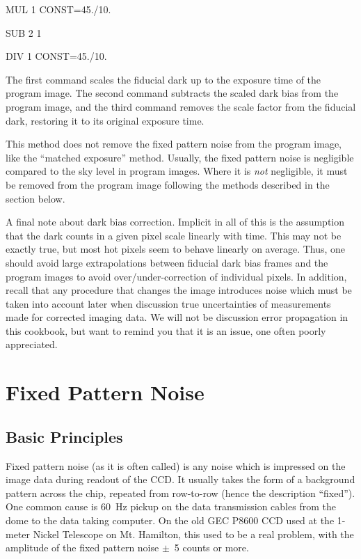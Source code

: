 \begin{command}
      \item MUL 1 CONST=45./10.
      \item SUB 2 1 
      \item DIV 1 CONST=45./10.
\end{command}

\noindent The first command scales the fiducial dark up to the exposure time
of the program image.  The second command subtracts the scaled dark bias from
the program image, and the third command removes the scale factor from the
fiducial dark, restoring it to its original exposure time.

This method does not remove the fixed pattern noise from the program image,
like the ``matched exposure'' method.  Usually, the fixed pattern noise is
negligible compared to the sky level in program images.  Where it is {\it not}
negligible, it must be removed from the program image following the methods
described in the section below. 

A final note about dark bias correction.  Implicit in all of this is the
assumption that the dark counts in a given pixel scale linearly with time.
This may not be exactly true, but most hot pixels seem to behave linearly on
average.  Thus, one should avoid large extrapolations between fiducial dark
bias frames and the program images to avoid over/under-correction of
individual pixels.  In addition, recall that any procedure that changes the
image introduces noise which must be taken into account later when discussion
true uncertainties of measurements made for corrected imaging data.  We
will not be discussion error propagation in this cookbook, but want to
remind you that it is an issue, one often poorly appreciated.


\section{Fixed Pattern Noise}

\subsection{Basic Principles}
\nobreak
Fixed pattern noise (as it is often called) is any noise which is impressed on
the image data during readout of the CCD.  It usually takes the form of a
background pattern across the chip, repeated from row-to-row (hence the
description ``fixed'').  One common cause is 60~Hz pickup on the data
transmission cables from the dome to the data taking computer. On the old GEC
P8600 CCD used at the 1-meter Nickel Telescope on Mt. Hamilton, this used to
be a real problem, with the amplitude of the fixed pattern noise $\pm$~5
counts or more. 

